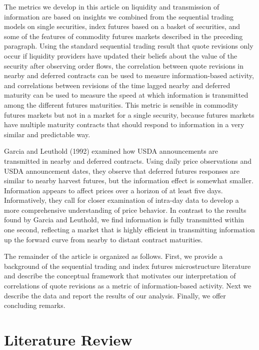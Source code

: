\documentclass[review,12pt]{elsarticle}
\begin{document}
The metrics we develop in this article on liquidity and transmission of
information are based on insights we combined from the sequential
trading models on single securities, index futures based on a basket of
securities, and some of the features of commodity futures markets
described in the preceding paragraph. Using the standard sequential
trading result that quote revisions only occur if liquidity providers
have updated their beliefs about the value of the security after
observing order flows, the correlation between quote revisions in nearby
and deferred contracts can be used to measure information-based
activity, and correlations between revisions of the time lagged nearby
and deferred maturity can be used to measure the speed at which
information is transmitted among the different futures maturities. This
metric is sensible in commodity futures markets but not in a market for
a single security, because futures markets have multiple maturity
contracts that should respond to information in a very similar and
predictable way.

Garcia and Leuthold (1992) examined how USDA announcements are
transmitted in nearby and deferred contracts. Using daily price
observations and USDA announcement dates, they observe that deferred
futures responses are similar to nearby harvest futures, but the
information effect is somewhat smaller. Information appears to affect
prices over a horizon of at least five days. Informatively, they call
for closer examination of intra-day data to develop a more comprehensive
understanding of price behavior. In contrast to the results found by
Garcia and Leuthold, we find information is fully transmitted within one
second, reflecting a market that is highly efficient in transmitting
information up the forward curve from nearby to distant contract
maturities.

The remainder of the article is organized as follows. First, we provide
a background of the sequential trading and index futures microstructure
literature and describe the conceptual framework that motivates our
interpretation of correlations of quote revisions as a metric of
information-based activity. Next we describe the data and report the
results of our analysis. Finally, we offer concluding remarks.

\section{Literature Review}\label{literature-review}
\end{document}
